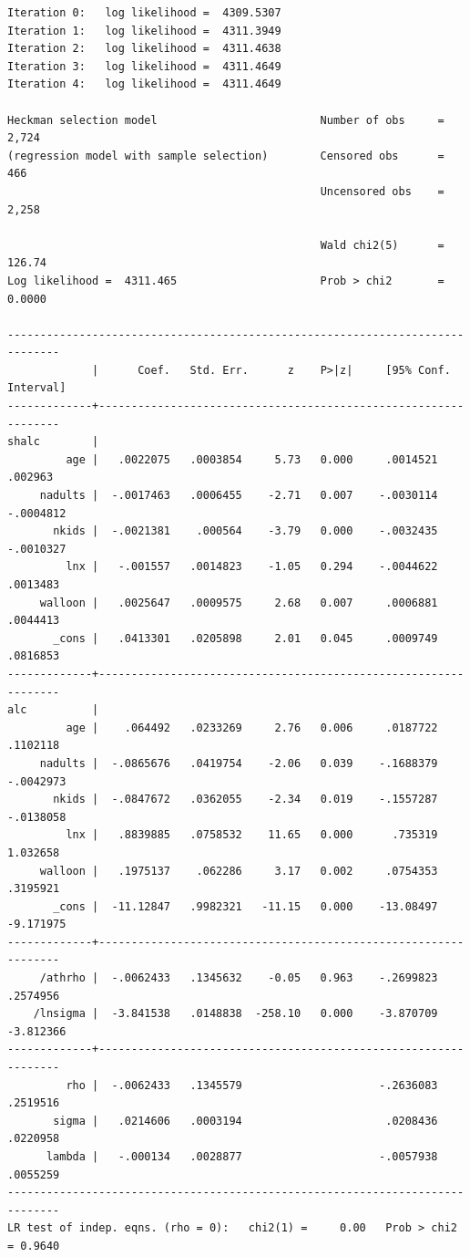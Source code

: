 \documentclass[]{book}
\begin{document}
\begin{verbatim}
Iteration 0:   log likelihood =  4309.5307  
Iteration 1:   log likelihood =  4311.3949  
Iteration 2:   log likelihood =  4311.4638  
Iteration 3:   log likelihood =  4311.4649  
Iteration 4:   log likelihood =  4311.4649  

Heckman selection model                         Number of obs     =      2,724
(regression model with sample selection)        Censored obs      =        466
                                                Uncensored obs    =      2,258

                                                Wald chi2(5)      =     126.74
Log likelihood =  4311.465                      Prob > chi2       =     0.0000

------------------------------------------------------------------------------
             |      Coef.   Std. Err.      z    P>|z|     [95% Conf. Interval]
-------------+----------------------------------------------------------------
shalc        |
         age |   .0022075   .0003854     5.73   0.000     .0014521     .002963
     nadults |  -.0017463   .0006455    -2.71   0.007    -.0030114   -.0004812
       nkids |  -.0021381    .000564    -3.79   0.000    -.0032435   -.0010327
         lnx |   -.001557   .0014823    -1.05   0.294    -.0044622    .0013483
     walloon |   .0025647   .0009575     2.68   0.007     .0006881    .0044413
       _cons |   .0413301   .0205898     2.01   0.045     .0009749    .0816853
-------------+----------------------------------------------------------------
alc          |
         age |    .064492   .0233269     2.76   0.006     .0187722    .1102118
     nadults |  -.0865676   .0419754    -2.06   0.039    -.1688379   -.0042973
       nkids |  -.0847672   .0362055    -2.34   0.019    -.1557287   -.0138058
         lnx |   .8839885   .0758532    11.65   0.000      .735319    1.032658
     walloon |   .1975137    .062286     3.17   0.002     .0754353    .3195921
       _cons |  -11.12847   .9982321   -11.15   0.000    -13.08497   -9.171975
-------------+----------------------------------------------------------------
     /athrho |  -.0062433   .1345632    -0.05   0.963    -.2699823    .2574956
    /lnsigma |  -3.841538   .0148838  -258.10   0.000    -3.870709   -3.812366
-------------+----------------------------------------------------------------
         rho |  -.0062433   .1345579                     -.2636083    .2519516
       sigma |   .0214606   .0003194                      .0208436    .0220958
      lambda |   -.000134   .0028877                     -.0057938    .0055259
------------------------------------------------------------------------------
LR test of indep. eqns. (rho = 0):   chi2(1) =     0.00   Prob > chi2 = 0.9640
\end{verbatim}
\end{document}
